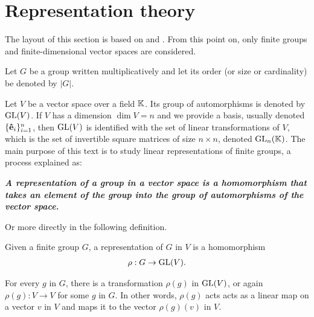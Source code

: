 \clearpage{\thispagestyle{empty}}
\section{Representation theory}

	
	The layout of this section is based on \cite{Serre} and \cite{FultonHarris}. From this point on, only finite groups and finite-dimensional vector spaces are considered. 
	
	Let $G$ be a group written multiplicatively and let its order (or size or cardinality) be denoted by $|G|$. 
	
	Let $V$ be a vector space over a field $\mathbb{K}$. Its group of automorphisms is denoted by $\text{GL}(V)$. If $V$ has a dimension $\dim V = n$ and we provide a basis, usually denoted $\{\mathbf{\hat{e}}_i\}_{i=1}^n$, then $\text{GL}(V)$ is identified with the set of linear transformations of $V$, which is the set of invertible square matrices of size $n \times n$, denoted $\text{GL}_n(\mathbb{K})$\cite[18.1]{DummitFoote}. The main purpose of this text is to study linear representations of finite groups, a process explained as:
	
	\textbf{\emph{A representation of a group in a vector space is a homomorphism that takes an element of the group into the group of automorphisms of the vector space.}}
	
	Or more directly in the following definition.
	
	\begin{definition}[Representation]
		Given a finite group $G$, a representation of $G$ in $V$ is a homomorphism
		\begin{align}
			\rho: G \rightarrow \text{GL}(V).
		\end{align}
	\end{definition}
	For every $g$ in $G$, there is a transformation $\rho(g)$ in $\text{GL}(V)$, or again $\rho(g): V \rightarrow V$ for some $g$ in $G$. In other words, $\rho(g)$ acts acts as a linear map on a vector $v$ in $V$ and maps it to the vector $\rho(g)(v)$ in $V$.
	
